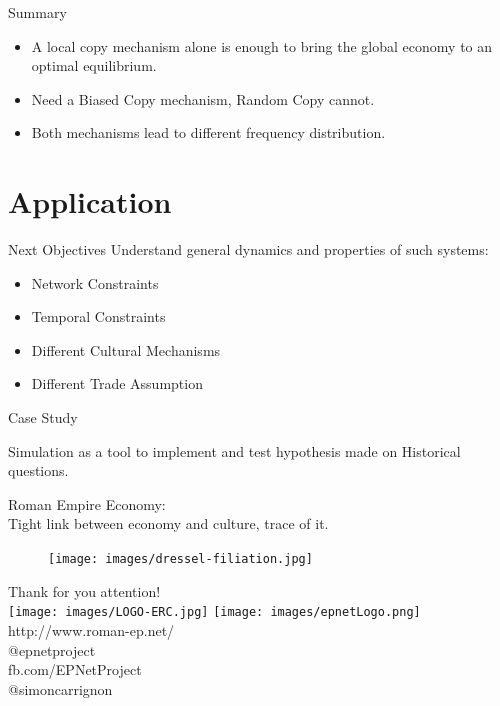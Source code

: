 \documentclass[12pt, handout=show,notes=show]{beamer}
\begin{document}
\begin{frame}{Summary}
\begin{itemize}
	\item A local copy mechanism alone is enough to bring the global economy to an optimal equilibrium.
		\vfill
	\item Need a Biased Copy mechanism, Random Copy cannot.
		\vfill
	\item Both mechanisms lead to different frequency distribution.
		\vfill
\end{itemize}

\end{frame}
\section{Application}
\begin{frame}{Next Objectives}
    \vfill
    Understand general dynamics and properties of such systems:
    \vfill
	\begin{itemize}
	\item Network Constraints
    \vfill
	\item Temporal Constraints
    \vfill
	\item Different Cultural Mechanisms
    \vfill
	\item Different Trade Assumption
    \vfill
	\end{itemize}
\end{frame}

\begin{frame}{Case Study}

	Simulation as a tool to implement and test hypothesis made on Historical questions.

	Roman Empire Economy: \\
	Tight link between economy and culture, trace of it. \\
	\begin{figure}
		\texttt{[image: images/dressel-filiation.jpg]}
	\end{figure}
	
\end{frame}

\begin{frame}
	\begin{center}
		\Large
    Thank for you attention!\\
		\texttt{[image: images/LOGO-ERC.jpg]} \hfil	\texttt{[image: images/epnetLogo.png]}\\
		\vspace{1cm}
		\scriptsize
			http://www.roman-ep.net/\\
			@epnetproject\\
			fb.com/EPNetProject\\
			@simoncarrignon
	\end{center}


\end{frame}

\end{document}
